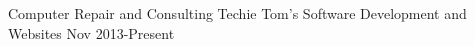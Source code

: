 \begin{cventries}
\cventry
    {Computer Repair and Consulting}
    {Techie Tom's}
    {Software Development and Websites}
    {Nov 2013-Present}
    {}
\end{cventries}
\vspace{-.5\baselineskip}

